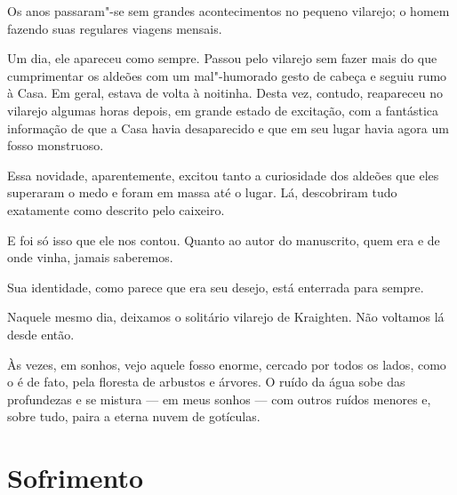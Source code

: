 Os anos passaram"-se sem grandes acontecimentos no pequeno vilarejo; o homem fazendo suas regulares viagens mensais.

Um dia, ele apareceu como sempre. Passou pelo vilarejo sem fazer mais do que cumprimentar os aldeões com um mal"-humorado
gesto de cabeça e seguiu rumo à Casa. Em geral, estava de volta à noitinha. Desta vez, contudo, reapareceu no
vilarejo algumas horas depois, em grande estado de excitação, com a fantástica informação de que a Casa havia
desaparecido e que em seu lugar havia agora um fosso monstruoso.

Essa novidade, aparentemente, excitou tanto a curiosidade dos aldeões que eles superaram o medo e foram em massa até o
lugar. Lá, descobriram tudo exatamente como descrito pelo caixeiro.

E foi só isso que ele nos contou. Quanto ao autor do manuscrito, quem era e de onde vinha, jamais saberemos.

Sua identidade, como parece que era seu desejo, está enterrada para sempre.

Naquele mesmo dia, deixamos o solitário vilarejo de Kraighten. Não voltamos lá desde então.

Às vezes, em sonhos, vejo aquele fosso enorme, cercado por todos os lados, como o é de fato, pela floresta de arbustos e
árvores. O ruído da água sobe das profundezas e se mistura --- em meus sonhos --- com outros ruídos menores e, sobre
tudo, paira a eterna nuvem de gotículas.


\cleardoublepage

\chapter[Sofrimento]{Sofrimento}


